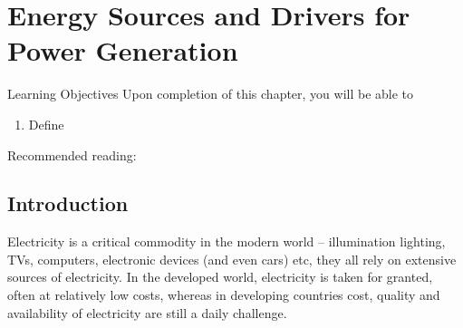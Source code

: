 
\chapter{Energy Sources and Drivers for Power Generation}\label{Chapter:EnergySourcesDrivers}

   \begin{LearningObjectivesBlock}{Learning Objectives}
      Upon completion of this chapter, you will be able to
        \begin{enumerate}
           \item Define 
        \end{enumerate}
\medskip
     Recommended reading: \citet{DiPippo_Book,Armstead_Book,Barbier_2002,Zarrouk_2014,Rybach_2003,Pollack_1993}
   \end{LearningObjectivesBlock}


\begin{comment}
   \begin{LearningObjectivesBlock}{Learning Objectives}
      Upon completion of this chapter, you will be able to
        \begin{enumerate}
           \item {\bf Knowledge:} Define, Name, Select, State 
           \item {\bf Comprehension:} Describe, Identify, Discuss
           \item {\bf Application:} Apply, Demonstrate, Employ, Sketch
           \item {\bf Analysis:} Analyse, Compare, Calculate, Solve
           \item {\bf Synthesis:} Determine, Formulate
           \item {\bf Evaluation:} Assess, Check, Estimate, Compare, Measure, Monitor
        \end{enumerate}
\end{comment}
  

\localtableofcontents


\section{Introduction}\label{Chapter:EnergySourcesDrivers:Section:Intro}

Electricity is a critical commodity in the modern world -- illumination lighting, TVs, computers, electronic devices (and even cars) etc, they all rely on extensive sources of electricity. In the developed world, electricity is taken for granted, often at relatively low costs, whereas in developing countries cost, quality and availability of electricity are still a daily challenge. 

